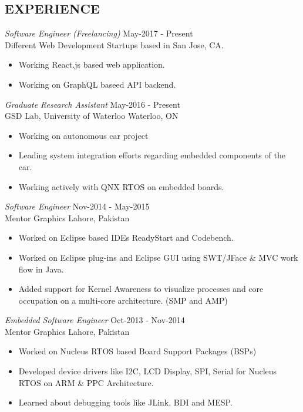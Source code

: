 \documentclass[margin, 10pt]{res} %
\begin{document}
\begin{resume}
 
\section{EXPERIENCE}

{\sl Software Engineer (Freelancing)} \hfill May-2017 - Present \\
Different Web Development Startups based in San Jose, CA. 

\begin{itemize} \itemsep -2pt %
\item Working React.js based web application. 

\item Working on GraphQL baseed API backend. 
\end{itemize}

{\sl Graduate Research Assistant} \hfill May-2016 - Present \\
GSD Lab, University of Waterloo \hfill Waterloo, ON

\begin{itemize} \itemsep -2pt %
\item Working on autonomous car project
\item Leading system integration efforts regarding embedded components of the car.
\item Working actively with QNX RTOS on embedded boards.
\end{itemize}
 
{\sl Software Engineer } \hfill Nov-2014 - May-2015 \\
Mentor Graphics  \hfill Lahore, Pakistan
\begin{itemize} \itemsep -2pt %
\item Worked on Eclipse based IDEs ReadyStart and Codebench. 
\item Worked on Eclipse plug-ins and Eclipse GUI using SWT/JFace \& MVC work flow in Java. 
\item Added support for Kernel Awareness to visualize processes and core occupation on a multi-core architecture. (SMP and AMP)
\end{itemize} 

{\sl Embedded Software Engineer} \hfill Oct-2013 - Nov-2014 \\
Mentor Graphics \hfill Lahore, Pakistan
\begin{itemize}  \itemsep -2pt %
\item Worked on Nucleus RTOS based Board Support Packages (BSPs)
\item Developed device drivers like I2C, LCD Display, SPI, Serial for Nucleus RTOS on ARM \& PPC Architecture.
\item Learned about debugging tools like JLink, BDI and MESP.
\end{itemize} 


\end{resume}
\end{document}
